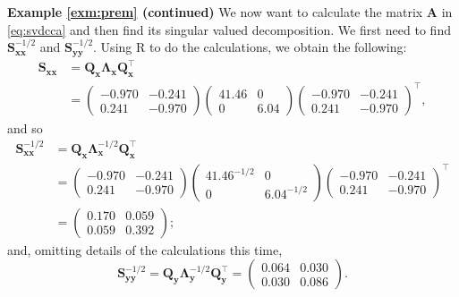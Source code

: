 \documentclass[]{book}
\theoremstyle{definition}
\theoremstyle{definition}
\theoremstyle{definition}
\theoremstyle{remark}
\begin{document}
\textbf{Example \ref{exm:prem} (continued)}
We now want to calculate the matrix \(\boldsymbol A\) in \eqref{eq:svdcca} and then find its singular valued decomposition. We first need to find \(\boldsymbol S_{\boldsymbol x\boldsymbol x}^{-1/2}\) and \(\boldsymbol S_{\boldsymbol y\boldsymbol y}^{-1/2}\).
Using R to do the calculations, we obtain the following:
\begin{align*}
\boldsymbol S_{\boldsymbol x\boldsymbol x}&=\boldsymbol Q_{\boldsymbol x} \boldsymbol \Lambda_{\boldsymbol x} \boldsymbol Q_{\boldsymbol x}^\top\\
&= \begin{pmatrix}  -0.970 & -0.241\\ 0.241 & -0.970 \end{pmatrix} \begin{pmatrix} 41.46 & 0 \\
 0 & 6.04\end{pmatrix} \begin{pmatrix} -0.970 & -0.241\\ 0.241 & -0.970  \end{pmatrix}^\top,
\end{align*}
and so
\begin{align*}
\boldsymbol S_{\boldsymbol x\boldsymbol x}^{-1/2}&=\boldsymbol Q_{\boldsymbol x} \boldsymbol \Lambda_{\boldsymbol x}^{-1/2} \boldsymbol Q_{\boldsymbol x}^\top\\
&= \begin{pmatrix}  -0.970 & -0.241\\ 0.241 & -0.970 \end{pmatrix} \begin{pmatrix} 41.46^{-1/2} & 0 \\
 0 & 6.04^{-1/2}\end{pmatrix} \begin{pmatrix} -0.970 & -0.241\\ 0.241 & -0.970  \end{pmatrix}^\top\\
 &=\begin{pmatrix} 0.170 & 0.059\\0.059  &  0.392 \end{pmatrix};
\end{align*}
and, omitting details of the calculations this time,
\[
\boldsymbol S_{\boldsymbol y\boldsymbol y}^{-1/2}=\boldsymbol Q_{\boldsymbol y} \boldsymbol \Lambda_{\boldsymbol y}^{-1/2} \boldsymbol Q_{\boldsymbol y}^\top=\begin{pmatrix} 0.064 & 0.030\\0.030 &  0.086 \end{pmatrix}.
\]
\end{document}
